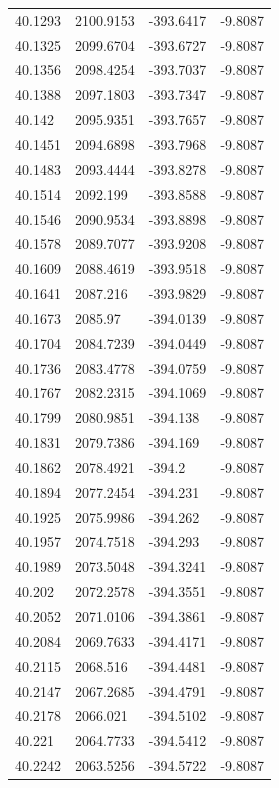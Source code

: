 \begin{table}[H]
\begin{tabular}{llll}
40.1293 & 2100.9153 & -393.6417 & -9.8087 \\
40.1325 & 2099.6704 & -393.6727 & -9.8087 \\
40.1356 & 2098.4254 & -393.7037 & -9.8087 \\
40.1388 & 2097.1803 & -393.7347 & -9.8087 \\
40.142 & 2095.9351 & -393.7657 & -9.8087 \\
40.1451 & 2094.6898 & -393.7968 & -9.8087 \\
40.1483 & 2093.4444 & -393.8278 & -9.8087 \\
40.1514 & 2092.199 & -393.8588 & -9.8087 \\
40.1546 & 2090.9534 & -393.8898 & -9.8087 \\
40.1578 & 2089.7077 & -393.9208 & -9.8087 \\
40.1609 & 2088.4619 & -393.9518 & -9.8087 \\
40.1641 & 2087.216 & -393.9829 & -9.8087 \\
40.1673 & 2085.97 & -394.0139 & -9.8087 \\
40.1704 & 2084.7239 & -394.0449 & -9.8087 \\
40.1736 & 2083.4778 & -394.0759 & -9.8087 \\
40.1767 & 2082.2315 & -394.1069 & -9.8087 \\
40.1799 & 2080.9851 & -394.138 & -9.8087 \\
40.1831 & 2079.7386 & -394.169 & -9.8087 \\
40.1862 & 2078.4921 & -394.2 & -9.8087 \\
40.1894 & 2077.2454 & -394.231 & -9.8087 \\
40.1925 & 2075.9986 & -394.262 & -9.8087 \\
40.1957 & 2074.7518 & -394.293 & -9.8087 \\
40.1989 & 2073.5048 & -394.3241 & -9.8087 \\
40.202 & 2072.2578 & -394.3551 & -9.8087 \\
40.2052 & 2071.0106 & -394.3861 & -9.8087 \\
40.2084 & 2069.7633 & -394.4171 & -9.8087 \\
40.2115 & 2068.516 & -394.4481 & -9.8087 \\
40.2147 & 2067.2685 & -394.4791 & -9.8087 \\
40.2178 & 2066.021 & -394.5102 & -9.8087 \\
40.221 & 2064.7733 & -394.5412 & -9.8087 \\
40.2242 & 2063.5256 & -394.5722 & -9.8087 \\

\end{tabular}
\end{table}
